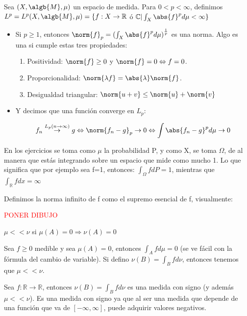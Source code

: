 \documentclass{apuntes}
\begin{document}
\begin{defn}
Sea $(X, \algb{M}, \mu)$ un espacio de medida. Para $0<p<\infty$, definimos $L^p=L^p(X,\algb{M},\mu)=\{f:X\rightarrow \mathbb{R}$ ó $\mathbb{C} | \int_X \abs{f}^p d\mu < \infty\}$

\begin{itemize}
\item Si $p \geq 1$, entonces $\norm{f}_p = (\int_X {\abs{f}^p d\mu)}^{\frac{1}{p}}$ es una norma. Algo es una si cumple estas tres propiedades:
\begin{enumerate}
\item Positividad: $\norm{f}\geq 0$ y $\norm{f} = 0 \Leftrightarrow f=0$.
\item Proporcionalidad: $\norm{\lambda f} = \abs{\lambda}\norm{f}$.
\item Desigualdad triangular: $\norm{u+v} \leq \norm{u}+\norm{v}$     
\end{enumerate}
\item Y decimos que una función converge en $L_p$:

\[
f_n \stackrel{L_p (n\rightarrow \infty)}{\rightarrow} g \Leftrightarrow \norm{f_n -g}_p  \rightarrow 0 \Leftrightarrow \int{\abs{f_n -g}^pd\mu} \rightarrow 0
\]
\end{itemize}

\obs En los ejercicios se toma como $\mu$ la probabilidad P, y como X, se toma $\Omega$, de al manera que estás integrando sobre un espacio que mide como mucho 1. Lo que significa que por ejemplo sea f=1, entonces: $\int_{\Omega}fdP = 1$, mientras que $\int_{\mathbb{R}}fdx = \infty$

\obs Definimos la norma infinito de f como el supremo esencial de f, visualmente:

\textcolor{red}{PONER DIBUJO}

\end{defn}

\begin{defn}
$\mu << \nu$ si $\mu(A)=0 \Rightarrow \nu(A)=0$

\begin{example}
Sea $f \geq 0$ medible y sea $\mu(A)=0$, entonces $\int_Afd\mu=0$ (se ve fácil con la fórmula del cambio de variable). Si defino $\nu(B)=\int_B fd\nu$, entonces tenemos que $\mu << \nu$.
\end{example}
\end{defn}

\begin{defn}
Sea $f:\mathbb{R}\rightarrow \mathbb{R}$, entonces $\nu(B)=\int_B fd\nu$ es una medida con signo (y además $\mu << \nu$). Es una medida con signo ya que al ser una medida que depende de una función que va de $[-\infty, \infty]$, puede adquirir valores negativos.
\end{defn}
\end{document}
